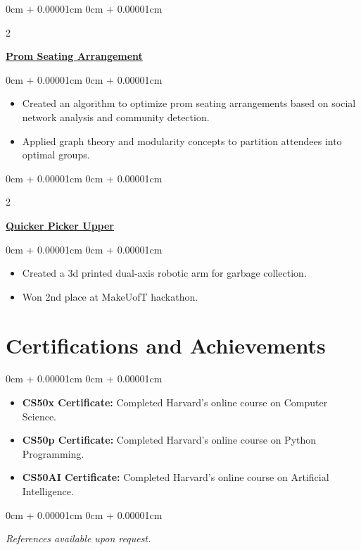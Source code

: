 \documentclass[10pt, letterpaper]{article}
\newenvironment{highlights}{
    \begin{itemize}[
        topsep=0.10cm,
        parsep=0.10cm,
        partopsep=0pt,
        itemsep=0pt,
        leftmargin=0cm + 10pt
    ]
}{
    \end{itemize}
}
\newenvironment{onecolentry}{
    \begin{adjustwidth}{
        0cm + 0.00001cm
    }{
        0cm + 0.00001cm
    }
}{
    \end{adjustwidth}
}
\newenvironment{twocolentry}[2][]{
    \onecolentry
    \def\secondColumn{#2}
    \setcolumnwidth{\fill, 5.5 cm} %
    \begin{paracol}{2}
}{
    \switchcolumn \raggedleft \secondColumn
    \end{paracol}
    \endonecolentry
}
\begin{document}
    \vspace{0.2cm}

    \begin{twocolentry}{}
        \textbf{\href{https://blucardin.github.io/projects/prom_seating/}{Prom Seating Arrangement}}
    \end{twocolentry}
    \vspace{0.10cm}
    \begin{onecolentry}
        \begin{highlights}
            \item Created an algorithm to optimize prom seating arrangements based on social network analysis and community detection.
            \item Applied graph theory and modularity concepts to partition attendees into optimal groups.
        \end{highlights}
    \end{onecolentry}

    \vspace{0.2cm}

    \begin{twocolentry}{}
        \textbf{\href{https://devpost.com/software/the-quicker-picker-upper}{Quicker Picker Upper}}
    \end{twocolentry}
    \vspace{0.10cm}
    \begin{onecolentry}
        \begin{highlights}
            \item Created a 3d printed dual-axis robotic arm for garbage collection. 
            \item Won 2nd place at MakeUofT hackathon. 
        \end{highlights}
    \end{onecolentry}

    \section{Certifications and Achievements}
    \begin{onecolentry}
        \begin{highlights}
            \item \textbf{CS50x Certificate:} Completed Harvard's online course on Computer Science.
            \item \textbf{CS50p Certificate:} Completed Harvard's online course on Python Programming.
            \item \textbf{CS50AI Certificate:} Completed Harvard's online course on Artificial Intelligence.
        \end{highlights}
    \end{onecolentry}



    \vspace{0.2cm}
    
    \begin{onecolentry}
        \textit{References available upon request.}
    \end{onecolentry}
\end{document}
